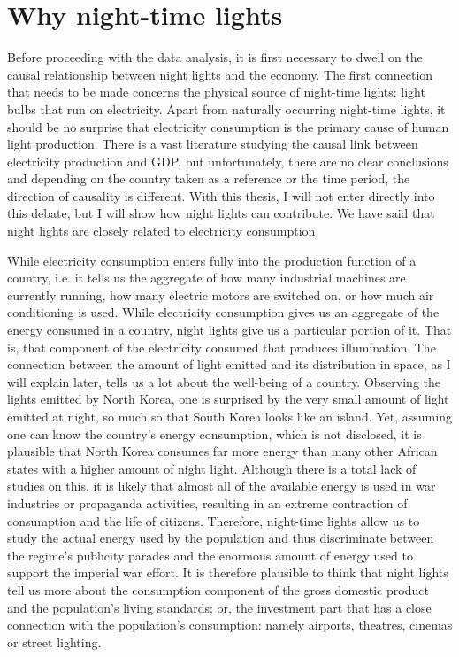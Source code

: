 \chapter{Why night-time lights}\label{ch:whynighttimelights}
Before proceeding with the data analysis, it is first necessary to dwell on the causal relationship between night lights and the economy. 
The first connection that needs to be made concerns the physical source of night-time lights: light bulbs that run on electricity. Apart from naturally occurring night-time lights, it should be no surprise that electricity consumption is the primary cause of human light production.
There is a vast literature studying the causal link between electricity production and GDP, but unfortunately, there are no clear conclusions and depending on the country taken as a reference or the time period, the direction of causality is different. With this thesis, I will not enter directly into this debate, but I will show how night lights can contribute. 
We have said that night lights are closely related to electricity consumption. 

While electricity consumption enters fully into the production function of a country, i.e. it tells us the aggregate of how many industrial machines are currently running, how many electric motors are switched on, or how much air conditioning is used. While electricity consumption gives us an aggregate of the energy consumed in a country, night lights give us a particular portion of it. That is, that component of the electricity consumed that produces illumination. 
The connection between the amount of light emitted and its distribution in space, as I will explain later, tells us a lot about the well-being of a country. 
Observing the lights emitted by North Korea, one is surprised by the very small amount of light emitted at night, so much so that South Korea looks like an island. Yet, assuming one can know the country's energy consumption, which is not disclosed, it is plausible that North Korea consumes far more energy than many other African states with a higher amount of night light. Although there is a total lack of studies on this, it is likely that almost all of the available energy is used in war industries or propaganda activities, resulting in an extreme contraction of consumption and the life of citizens.
Therefore, night-time lights allow us to study the actual energy used by the population and thus discriminate between the regime's publicity parades and the enormous amount of energy used to support the imperial war effort.
It is therefore plausible to think that night lights tell us more about the consumption component of the gross domestic product and the population's living standards; or, the investment part that has a close connection with the population's consumption: namely airports, theatres, cinemas or street lighting. 

